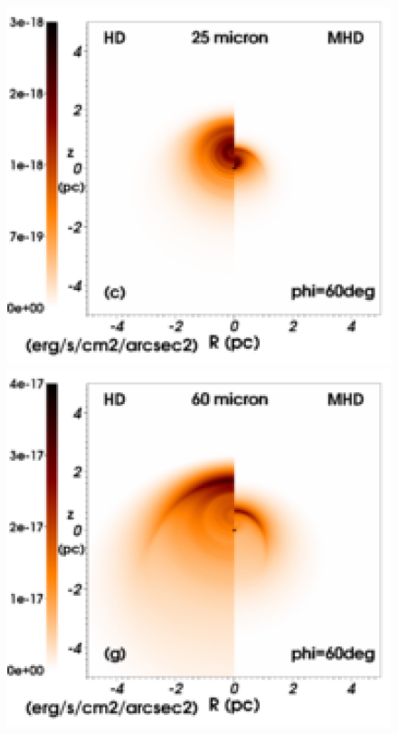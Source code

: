 \documentclass[useAMS,usenatbib]{mn2e}
\begin{document}
\begin{figure}
\begin{minipage}[b]{ 0.32\textwidth}
	\end{minipage}	\\
	\begin{minipage}[b]{ 0.32\textwidth}
			\centering
	        \includegraphics[width=1.0\textwidth]{./map_2040_60deg_lambda25_legend.eps}
	\end{minipage}
	\begin{minipage}[b]{ 0.32\textwidth}
			\centering
	        \includegraphics[width=1.0\textwidth]{./map_2040_60deg_lambda60_legend.eps}

\end{minipage}
\end{figure}
\end{document}
